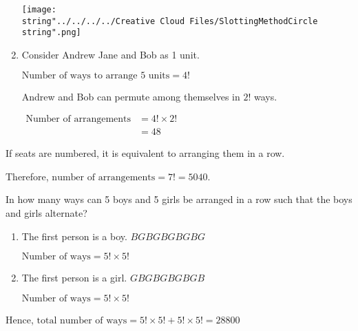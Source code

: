 \documentclass[11pt,a4paper]{book}
\begin{document}
\begin{example}
\begin{enumerate}[label=(\alph*)]
\begin{minipage}[t]{.6\textwidth}
\end{minipage}
\begin{minipage}[t]{.4\textwidth}
\begin{center}
\texttt{[image: \\string"../../../../Creative Cloud Files/SlottingMethodCircle\\string".png]}
\par\end{center}

\end{minipage}

\item  Consider Andrew Jane and Bob as 1 unit.

$\text{Number of ways to arrange 5 units}=4!$

Andrew and Bob can permute among themselves in $2!$ ways.

$
\begin{aligned}
\text{Number of arrangements} & =4!\times2!\\
 & =48
\end{aligned}
$

\end{enumerate}

If seats are numbered, it is equivalent to arranging them in a row.

Therefore, $\text{number of arrangements}=7!=5040$.

\end{example}

\newpage

\begin{example}

In how many ways can 5 boys and 5 girls be arranged in a row such
that the boys and girls alternate?

\Solution

\begin{enumerate}[label=Case \arabic*:,leftmargin=1.5cm]

\item The first person is a boy. \hspace{1cm}$BGBGBGBGBG$

$\text{Number of ways}=5!\times5!$

\item The first person is a girl. \hspace{1cm}$GBGBGBGBGB$

$\text{Number of ways}=5!\times5!$

\end{enumerate}

Hence, $\text{total number of ways}=5!\times5!+5!\times5!=28800$

\end{example}
\end{document}
